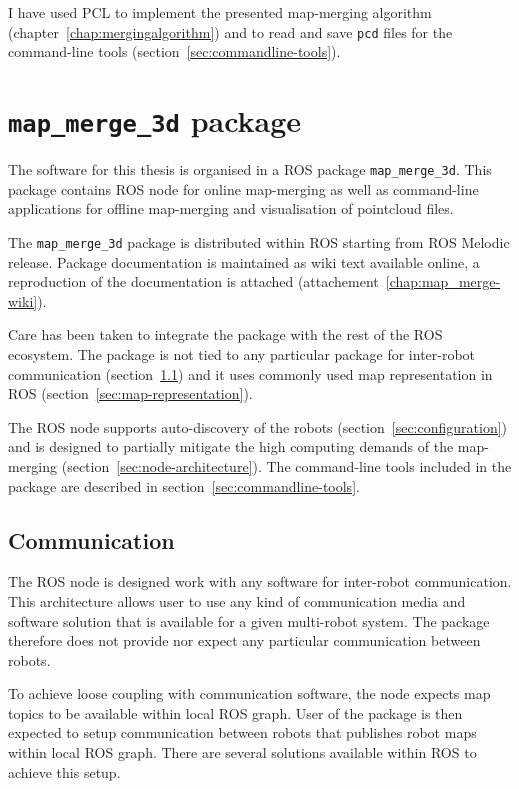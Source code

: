 I have used \gls{PCL} to implement the presented map-merging algorithm (chapter~\ref{chap:mergingalgorithm}) and to read and save \texttt{pcd} files for the command-line tools (section~\ref{sec:commandline-tools}).

\section{\texttt{map\_merge\_3d} package}
\label{sec:ros-package}

The software for this thesis is organised in a \gls{ROS} package \texttt{map\_merge\_3d}. This package contains \gls{ROS} node for online map-merging as well as command-line applications for offline map-merging and visualisation of pointcloud files.

The \texttt{map\_merge\_3d} package is distributed within \gls{ROS} starting from \gls{ROS} Melodic release. Package documentation is maintained as wiki text available online, a reproduction of the documentation is attached (attachement~\ref{chap:map_merge-wiki}).

Care has been taken to integrate the package with the rest of the \gls{ROS} ecosystem. The package is not tied to any particular package for inter-robot communication (section~\ref{sec:communication}) and it uses commonly used map representation in \gls{ROS} (section~\ref{sec:map-representation}).

The \gls{ROS} node supports auto-discovery of the robots (section~\ref{sec:configuration}) and is designed to partially mitigate the high computing demands of the map-merging (section~\ref{sec:node-architecture}). The command-line tools included in the package are described in section~\ref{sec:commandline-tools}.

\subsection{Communication}
\label{sec:communication}

The \gls{ROS} node is designed work with any software for inter-robot communication. This architecture allows user to use any kind of communication media and software solution that is available for a given multi-robot system. The package therefore does not provide nor expect any particular communication between robots.

To achieve loose coupling with communication software, the node expects map topics to be available within local \gls{ROS} graph. User of the package is then expected to setup communication between robots that publishes robot maps within local \gls{ROS} graph. There are several solutions available within \gls{ROS} to achieve this setup.

